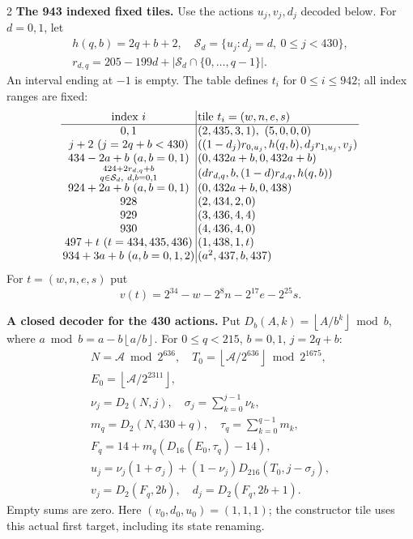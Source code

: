 \documentclass[10pt]{article}
\newcommand{\fl}[1]{\left\lfloor#1\right\rfloor}
\newcommand{\rg}[2]{\{#1,\ldots,#2\}}
\begin{document}
\begin{multicols}{2}
\textbf{The 943 indexed fixed tiles.}
Use the actions $u_j,v_j,d_j$ decoded below. For $d=0,1$, let
\[
\begin{gathered}
h(q,b)=2q+b+2,\quad
\mathcal S_d=\{u_j:d_j=d,\ 0\le j<430\},\\
r_{d,q}=205-199d+|\mathcal S_d\cap\rg0{q-1}|.
\end{gathered}
\]
An interval ending at $-1$ is empty. The table defines $t_i$ for
$0\le i\le942$; all index ranges are fixed:
\[
\setlength{\arraycolsep}{1.4pt}\begin{array}{c|l}
\text{index }i&\text{tile }t_i=(w,n,e,s)\\\hline
0,1&(2,435,3,1),\ (5,0,0,0)\\
j+2\ (j=2q+b<430)&((1-d_j)r_{0,u_j},h(q,b),d_jr_{1,u_j},v_j)\\
434-2a+b\ (a,b=0,1)&(0,432a+b,0,432a+b)\\
\substack{424+2r_{d,q}+b\\q\in\mathcal S_d,\ d,b=0,1}&(dr_{d,q},b,(1-d)r_{d,q},h(q,b))\\
924+2a+b\ (a,b=0,1)&(0,432a+b,0,438)\\
928&(2,434,2,0)\\
929&(3,436,4,4)\\
930&(4,436,4,0)\\
497+t\ (t=434,435,436)&(1,438,1,t)\\
934+3a+b\ (a,b=0,1,2)&(a^2,437,b,437)
\end{array}
\]
For $t=(w,n,e,s)$ put
\[
v(t)=2^{34}-w-2^8n-2^{17}e-2^{25}s.
\]

\textbf{A closed decoder for the 430 actions.}
Put $D_b(A,k)=\fl{A/b^k}\bmod b$, where
$a\bmod b=a-b\fl{a/b}$. For $0\le q<215$, $b=0,1$, $j=2q+b$:
\[
\begin{gathered}
N=\mathcal A\bmod2^{636},\quad
T_0=\fl{\mathcal A/2^{636}}\bmod2^{1675},\\
E_0=\fl{\mathcal A/2^{2311}},\\
\nu_j=D_2(N,j),\quad \sigma_j=\sum_{k=0}^{j-1}\nu_k,\\
m_q=D_2(N,430+q),\quad \tau_q=\sum_{k=0}^{q-1}m_k,\\
F_q=14+m_q(D_{16}(E_0,\tau_q)-14),\\
u_j=\nu_j(1+\sigma_j)+(1-\nu_j)D_{216}(T_0,j-\sigma_j),\\
v_j=D_2(F_q,2b),\quad d_j=D_2(F_q,2b+1).
\end{gathered}
\]
Empty sums are zero. Here $(v_0,d_0,u_0)=(1,1,1)$; the constructor tile
uses this actual first target, including its state renaming.


\end{multicols}
\end{document}
